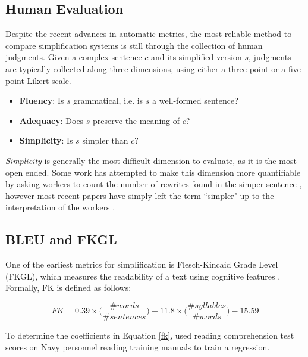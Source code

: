 \documentclass[thesis.tex]{subfiles}
\begin{document}
\subsection{Human Evaluation} \label{sec:human_eval}

Despite the recent advances in automatic metrics, the most reliable method to compare simplification systems is still through the collection of human judgments. Given a complex sentence $c$ and its simplified version $s$, judgments are typically collected along three dimensions, using either a three-point or a five-point Likert scale.

\begin{itemize}
    \item \textbf{Fluency}: Is $s$ grammatical, i.e. is $s$ a well-formed sentence?
    \item \textbf{Adequacy}: Does $s$ preserve the meaning of $c$?
    \item \textbf{Simplicity}: Is $s$ simpler than $c$?
\end{itemize}

\textit{Simplicity} is generally the most difficult dimension to evaluate, as it is the most open ended. Some work has attempted to make this dimension more quantifiable by asking workers to count the number of rewrites found in the simper sentence \citep{xu2015problems}, however most recent papers have simply left the term ``simpler" up to the interpretation of the workers \citep{zhang2017sentence, jiang2020neural}.

\subsection{BLEU and FKGL}

One of the earliest metrics for simplification is Flesch-Kincaid Grade Level (FKGL), which measures the readability of a text using cognitive features \citep{kincaid1975derivation}. Formally, FK is defined as follows:

\begin{equation} \label{fk}
    FK = 0.39 \times \bigg(\frac{\# words}{\# sentences}\bigg) + 11.8 \times \bigg(\frac{\# syllables}{\# words}\bigg) - 15.59
\end{equation}

To determine the coefficients in Equation \ref{fk}, \cite{kincaid1975derivation} used reading comprehension test scores on Navy personnel reading training manuals to train a regression.
\end{document}
